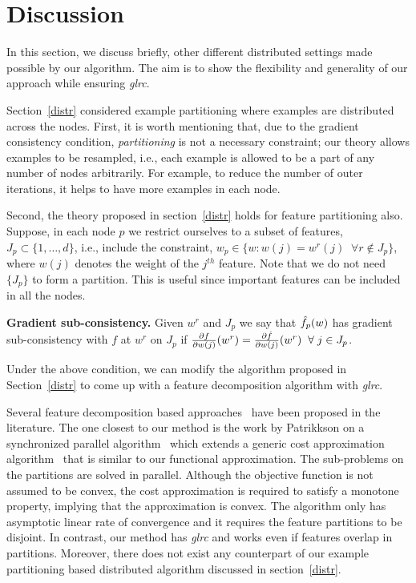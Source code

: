 \section{Discussion}
\label{disc}

In this section, we discuss briefly, other different distributed settings made possible by our algorithm. The aim is to show the flexibility and generality of our approach while ensuring {\it glrc}.

Section~\ref{distr} considered example partitioning where examples are distributed across the nodes. First, it is worth mentioning that, due to the gradient consistency condition, {\it partitioning} is not a necessary constraint; our theory allows examples to be resampled, i.e., each example is allowed to be a part of any number of nodes arbitrarily. For example, to reduce the number of outer iterations, it helps to have more examples in each node.

Second, the theory proposed in section~\ref{distr} holds for feature partitioning also. Suppose, in each node $p$ we restrict ourselves to a subset of features, $J_p\subset \{1,\ldots,d\}$, i.e., include the constraint,
$w_p \in  \{ w: w(j)=w^r(j) \;\; \forall r\not\in J_p\}$,
where $w(j)$ denotes the weight of the $j^{th}$ feature. Note that we do not need $\{J_p\}$ to form a partition. This is useful since important features can be included in all the nodes.

{\bf Gradient sub-consistency.} Given $w^r$ and $J_p$ we say that $\hat{f}_p(w)$ has gradient sub-consistency with $f$ at $w^r$ on $J_p$ if $\frac{\partial f}{\partial w(j)} (w^r) = \frac{\partial \hat{f}}{\partial w(j)} (w^r) \;\; \forall \; j\in J_p$.

Under the above condition, we can modify the algorithm proposed in Section~\ref{distr} to come up with a feature decomposition algorithm with {\it glrc}.

Several feature decomposition based approaches~\cite{richtarik2013,patriksson1998fp} have been proposed in the literature. The one closest to our method is the work by Patrikkson on a synchronized parallel algorithm~\cite{patriksson1998fp} which extends a generic cost approximation algorithm~\cite{patriksson1998ca} that is similar to our functional approximation. The sub-problems on the partitions are solved in parallel. Although the objective function is not assumed to be convex, the cost approximation is required to satisfy a monotone property, implying that the approximation is convex. The algorithm only has asymptotic linear rate of convergence and it requires the feature partitions to be disjoint. In contrast, our method has {\it glrc} and works even if features overlap in partitions. Moreover, there does not exist any counterpart of our example partitioning based distributed algorithm discussed in section~\ref{distr}.

